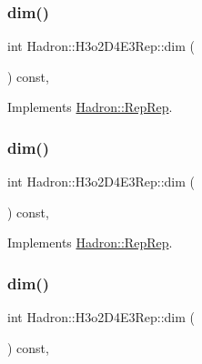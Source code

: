\subsubsection{\texorpdfstring{dim()}{dim()}\hspace{0.1cm}{\footnotesize\ttfamily [3/5]}}
{\footnotesize\ttfamily int Hadron\+::\+H3o2\+D4\+E3\+Rep\+::dim (\begin{DoxyParamCaption}{ }\end{DoxyParamCaption}) const\hspace{0.3cm}{\ttfamily [inline]}, {\ttfamily [virtual]}}



Implements \mbox{\hyperlink{structHadron_1_1RepRep_a92c8802e5ed7afd7da43ccfd5b7cd92b}{Hadron\+::\+Rep\+Rep}}.

\mbox{\label{structHadron_1_1H3o2D4E3Rep_a4351e7e6c874fae945df9917ba9bf56d}} 
\subsubsection{\texorpdfstring{dim()}{dim()}\hspace{0.1cm}{\footnotesize\ttfamily [4/5]}}
{\footnotesize\ttfamily int Hadron\+::\+H3o2\+D4\+E3\+Rep\+::dim (\begin{DoxyParamCaption}{ }\end{DoxyParamCaption}) const\hspace{0.3cm}{\ttfamily [inline]}, {\ttfamily [virtual]}}



Implements \mbox{\hyperlink{structHadron_1_1RepRep_a92c8802e5ed7afd7da43ccfd5b7cd92b}{Hadron\+::\+Rep\+Rep}}.

\mbox{\label{structHadron_1_1H3o2D4E3Rep_a4351e7e6c874fae945df9917ba9bf56d}} 
\subsubsection{\texorpdfstring{dim()}{dim()}\hspace{0.1cm}{\footnotesize\ttfamily [5/5]}}
{\footnotesize\ttfamily int Hadron\+::\+H3o2\+D4\+E3\+Rep\+::dim (\begin{DoxyParamCaption}{ }\end{DoxyParamCaption}) const\hspace{0.3cm}{\ttfamily [inline]}, {\ttfamily [virtual]}}



